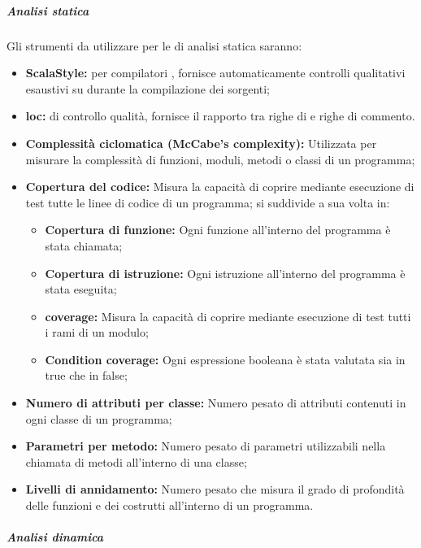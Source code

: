 \documentclass{scalatekids-article}
\begin{document}
\subparagraph{Analisi statica}

\label{sec:AnalisiStatica}
Gli strumenti da utilizzare per le  di analisi statica saranno:
\begin{itemize}
    \item\textbf{ScalaStyle:}  per compilatori , fornisce automaticamente controlli qualitativi esaustivi su  durante la compilazione dei sorgenti;
    \item\textbf{loc:}  di controllo qualità, fornisce il rapporto tra righe di  e righe di commento.
    \item\textbf{Complessità ciclomatica (McCabe's complexity):} Utilizzata per
        misurare la complessità di funzioni, moduli, metodi o classi di un
        programma;
    \item\textbf{Copertura del codice:} Misura la capacità di coprire mediante
        esecuzione di test tutte le linee di codice di un programma; si
        suddivide a sua volta in:
        \begin{itemize}
            \item\textbf{Copertura di funzione:} Ogni funzione all'interno del
                programma è stata chiamata;
            \item\textbf{Copertura di istruzione:} Ogni istruzione all'interno
                del programma è stata eseguita;
            \item\textbf{ coverage:} Misura la capacità di coprire
                mediante esecuzione di test tutti i rami di un modulo;
            \item\textbf{Condition coverage:} Ogni espressione booleana è stata
                valutata sia in true che in false;
        \end{itemize}
    \item\textbf{Numero di attributi per classe:} Numero pesato di attributi
        contenuti in ogni classe di un programma;
    \item\textbf{Parametri per metodo:} Numero pesato di parametri utilizzabili
        nella chiamata di metodi all'interno di una classe;
    \item\textbf{Livelli di annidamento:} Numero pesato che misura il grado di
        profondità delle funzioni e dei costrutti all'interno di un programma.
\end{itemize}

\subparagraph{Analisi dinamica}
\end{document}
